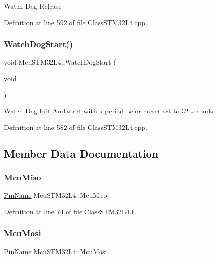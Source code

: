 Watch Dog Release 

Definition at line 592 of file Class\+S\+T\+M32\+L4.\+cpp.

\mbox{\label{class_mcu_s_t_m32_l4_a23e5654a6ab8be1c439e6831dd41dc42}} 
\subsubsection{\texorpdfstring{Watch\+Dog\+Start()}{WatchDogStart()}}
{\footnotesize\ttfamily void Mcu\+S\+T\+M32\+L4\+::\+Watch\+Dog\+Start (\begin{DoxyParamCaption}\item[{void}]{ }\end{DoxyParamCaption})}

Watch Dog Init And start with a period befor ereset set to 32 seconds 

Definition at line 582 of file Class\+S\+T\+M32\+L4.\+cpp.



\subsection{Member Data Documentation}
\mbox{\label{class_mcu_s_t_m32_l4_aefd030de1784ff86cc5d863879a72365}} 
\subsubsection{\texorpdfstring{Mcu\+Miso}{McuMiso}}
{\footnotesize\ttfamily \mbox{\hyperlink{_class_s_t_m32_l0_8h_a5ceb873075d76667eb54dc6a7d2734d1}{Pin\+Name}} Mcu\+S\+T\+M32\+L4\+::\+Mcu\+Miso}



Definition at line 74 of file Class\+S\+T\+M32\+L4.\+h.

\mbox{\label{class_mcu_s_t_m32_l4_a57b6d088d088ea3aca6318371f54486b}} 
\subsubsection{\texorpdfstring{Mcu\+Mosi}{McuMosi}}
{\footnotesize\ttfamily \mbox{\hyperlink{_class_s_t_m32_l0_8h_a5ceb873075d76667eb54dc6a7d2734d1}{Pin\+Name}} Mcu\+S\+T\+M32\+L4\+::\+Mcu\+Mosi}



